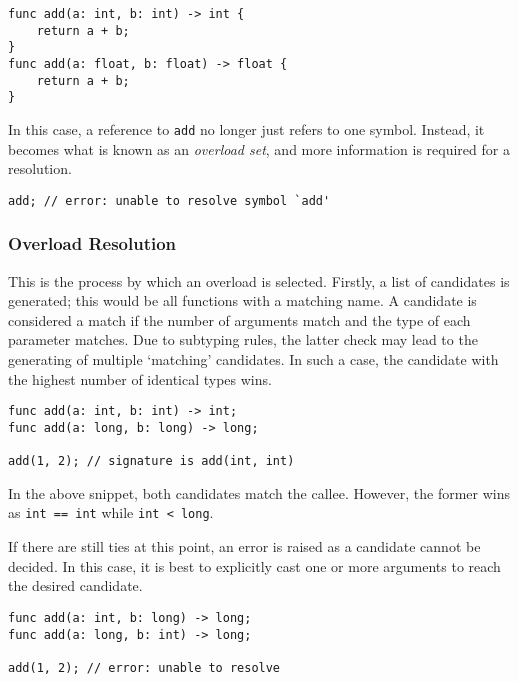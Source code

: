 \documentclass{article}
\begin{document}
    \begin{lstlisting}[language=CustomLang]
func add(a: int, b: int) -> int {
    return a + b;
}
func add(a: float, b: float) -> float {
    return a + b;
}
    \end{lstlisting}

    In this case, a reference to \texttt{add} no longer just refers to one symbol.
    Instead, it becomes what is known as an \textit{overload set}, and more information is required for a resolution.

    \begin{lstlisting}[language=CustomLang]
add; // error: unable to resolve symbol `add'
    \end{lstlisting}

    \subsubsection{Overload Resolution}

    This is the process by which an overload is selected.
    Firstly, a list of candidates is generated; this would be all functions with a matching name.
    A candidate is considered a match if the number of arguments match and the type of each parameter matches.
    Due to subtyping rules, the latter check may lead to the generating of multiple `matching' candidates.
    In such a case, the candidate with the highest number of identical types wins.

    \begin{lstlisting}[language=CustomLang]
func add(a: int, b: int) -> int;
func add(a: long, b: long) -> long;

add(1, 2); // signature is add(int, int)
    \end{lstlisting}

    In the above snippet, both candidates match the callee.
    However, the former wins as \texttt{int == int} while \texttt{int < long}.

    If there are still ties at this point, an error is raised as a candidate cannot be decided.
    In this case, it is best to explicitly cast one or more arguments to reach the desired candidate.

    \begin{lstlisting}[language=CustomLang]
func add(a: int, b: long) -> long;
func add(a: long, b: int) -> long;

add(1, 2); // error: unable to resolve
    \end{lstlisting}
\end{document}
